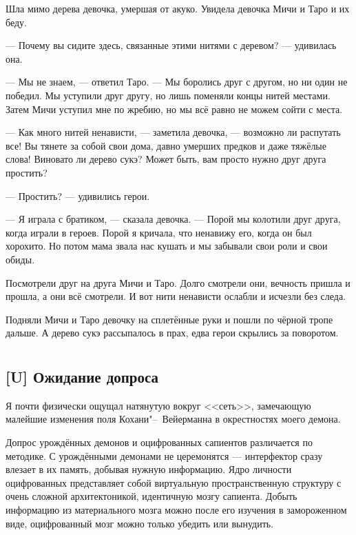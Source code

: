 Шла мимо дерева девочка, умершая от акуко\FM.
Увидела девочка Мичи и Таро и их беду.

--- Почему вы сидите здесь, связанные этими нитями с деревом? --- удивилась она.

--- Мы не знаем, --- ответил Таро.
--- Мы боролись друг с другом, но ни один не победил.
Мы уступили друг другу, но лишь поменяли концы нитей местами.
Затем Мичи уступил мне по жребию, но мы всё равно не можем сойти с места.

--- Как много нитей ненависти, --- заметила девочка, --- возможно ли распутать все!
Вы тянете за собой свои дома\FM, давно умерших предков и даже тяжёлые слова!
Виновато ли дерево сукэ?
Может быть, вам просто нужно друг друга простить?

--- Простить? --- удивились герои.

--- Я играла с братиком, --- сказала девочка.
--- Порой мы колотили друг друга, когда играли в героев.
Порой я кричала, что ненавижу его, когда он был хорохито.
Но потом мама звала нас кушать и мы забывали свои роли и свои обиды.

Посмотрели друг на друга Мичи и Таро.
Долго смотрели они, вечность пришла и прошла, а они всё смотрели.
И вот нити ненависти ослабли и исчезли без следа.

Подняли Мичи и Таро девочку на сплетённые руки и пошли по чёрной тропе дальше.
А дерево сукэ рассыпалось в прах, едва герои скрылись за поворотом.

\chapter{}

\section{[U] Ожидание допроса}

\textspace

Я почти физически ощущал натянутую вокруг <<сеть>>, замечающую малейшие изменения поля Кохани"--~Вейерманна в окрестностях моего демона.

Допрос урождённых демонов и оцифрованных сапиентов различается по методике.
С урождёнными демонами не церемонятся --- интерфектор сразу влезает в их память, добывая нужную информацию.
Ядро личности оцифрованных представляет собой виртуальную пространственную структуру с очень сложной архитектоникой, идентичную мозгу сапиента.
Добыть информацию из материального мозга можно после его изучения в замороженном виде, оцифрованный мозг можно только убедить или вынудить.

